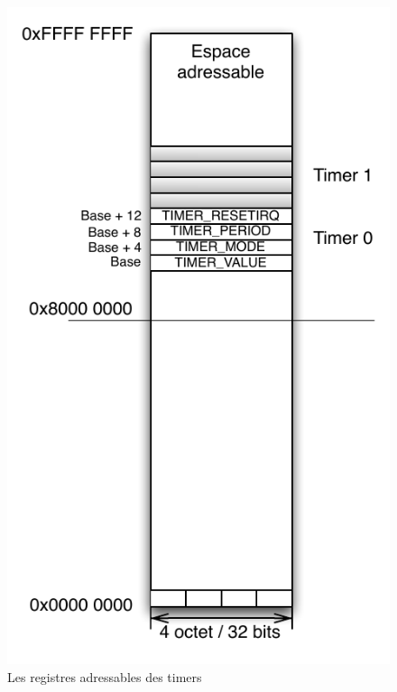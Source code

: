 \documentclass[11pt,english,french]{scrreprt}
\theoremstyle{remark}
\theoremstyle{definition}
\begin{document}
\begin{figure}
	\center
	\includegraphics[scale=.5]{diagrammes/timer_addresses}
	\vspace{-10pt}
	\caption{Les registres adressables des timers}
	\vspace{-35pt}
\end{figure}
\end{document}
